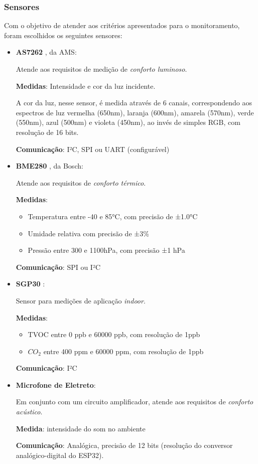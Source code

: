 \documentclass[../monografia.tex]{subfiles}
\begin{document}
\subsubsection{Sensores}
Com o objetivo de atender aos critérios apresentados para o monitoramento, foram escolhidos os seguintes sensores: 
\begin{itemize}
\item \textbf{AS7262} \cite{as7262}, da AMS: 

Atende aos requisitos de medição de \textit{conforto luminoso}. 

\textbf{Medidas}: Intensidade e cor da luz incidente.

A cor da luz, nesse sensor, é medida através de 6 canais, correspondendo aos espectros de luz vermelha (650nm), laranja (600nm), amarela (570nm), verde (550nm), azul (500nm) e violeta (450nm), ao invés de simples RGB, com resolução de 16 bits.

\textbf{Comunicação}: I²C, SPI ou UART (configurável)

\item \textbf{BME280} \cite{bme280}, da Bosch: 

Atende aos requisitos de \textit{conforto térmico}. 

\textbf{Medidas}: 
    \begin{itemize}
    \item Temperatura entre -40 e 85°C, com precisão de ±1.0°C
    \item Umidade relativa com precisão de ±3\%
    \item Pressão entre 300 e 1100hPa, com precisão ±1 hPa
    \end{itemize}

\textbf{Comunicação}: SPI ou I²C

\item \textbf{SGP30} \cite{sgp30}:

Sensor para medições de aplicação \textit{indoor}. 

\textbf{Medidas}:
    \begin{itemize}
    \item TVOC entre 0 ppb e 60000 ppb, com resolução de 1ppb
    \item $CO_{2}$ entre 400 ppm e 60000 ppm, com resolução de 1ppb
    \end{itemize}

\textbf{Comunicação}: I²C

\item \textbf{Microfone de Eletreto}:

Em conjunto com um circuito amplificador, atende aos requisitos de \textit{conforto acústico}. 

\textbf{Medida}: intensidade do som no ambiente

\textbf{Comunicação}: Analógica, precisão de 12 bits (resolução do conversor analógico-digital do ESP32). 
\end{itemize}
\end{document}
